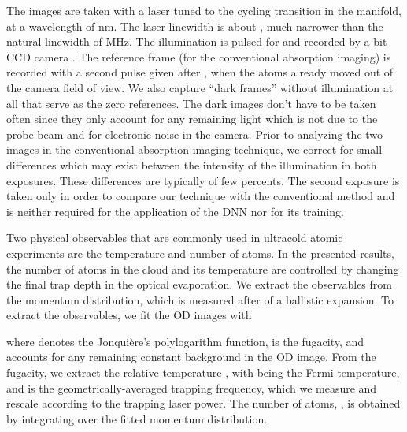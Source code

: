 \documentclass[twocolumn,groupedaddress,longbibliography]{revtex4-1}
\begin{document}
The images are taken with a laser tuned to the cycling transition  in the  manifold, at a wavelength of nm. The laser linewidth is about , much narrower than the  natural linewidth of MHz. The illumination is pulsed for   and recorded by a  bit CCD camera \cite{pixelflyModel}. The reference frame (for the conventional absorption imaging) is recorded with a second pulse given after , when the atoms already moved out of the camera field of view. We also capture ``dark frames'' without illumination at all that serve as the zero references. The dark images don't have to be taken often since they only account for any remaining light which is not due to the probe beam and for electronic noise in the camera. Prior to analyzing the two images in the conventional absorption imaging technique, we correct for small differences which may exist between the intensity of the illumination in both exposures. These differences are typically of few percents. The second exposure is taken only in order to compare our technique with the conventional method and is neither required for the application of the DNN nor for its training.

Two physical observables that are commonly used in ultracold atomic experiments are the temperature and number of atoms. In the presented results, the number of atoms in the cloud and its temperature are controlled by changing the final trap depth in the optical evaporation. We extract the observables from the momentum distribution, which is measured after  of a ballistic expansion. To extract the observables, we fit the OD images with \cite{MakingProbing}

where  denotes the Jonqui\`{e}re's polylogarithm function,  is the fugacity, and  accounts for any remaining constant background in the OD image. From the fugacity, we extract the relative temperature , with  being the Fermi temperature, and  is the geometrically-averaged trapping frequency, which we measure and rescale according to the trapping laser power. The number of atoms, , is obtained by integrating over the fitted momentum distribution.
\end{document}
